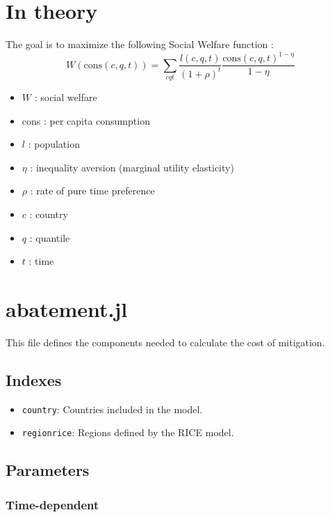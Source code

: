 \documentclass[
]{article}
\providecommand{\tightlist}{%
  \setlength{\itemsep}{0pt}\setlength{\parskip}{0pt}}
\begin{document}
\section{In theory}

The goal is to maximize the following Social Welfare function : 
\begin{equation} 
W(\text{cons}(c,q,t)) = \sum_{cqt} \frac{l(c,q,t)}{(1+\rho)^t}\frac{\text{cons}(c,q,t)^{1-\eta}}{1 - \eta}
\end{equation}

\begin{itemize}
\item $W$ : social welfare
\item cons :  per capita consumption
\item $l$ : population
\item $\eta$ : inequality aversion (marginal utility elasticity)
\item $\rho$ : rate of pure time preference
\item $c$ : country
\item $q$ : quantile
\item $t$ : time
\end{itemize}


\section{abatement.jl}\label{abatement.jl}

This file defines the components needed to calculate the cost of
mitigation.

\subsection{Indexes}\label{indexes}

\begin{itemize}
\tightlist
\item
  \texttt{country}: Countries included in the model.
\item
  \texttt{regionrice}: Regions defined by the RICE model.
\end{itemize}

\subsection{Parameters}\label{parameters}

\subsubsection{Time-dependent}\label{time-dependent}
\end{document}

